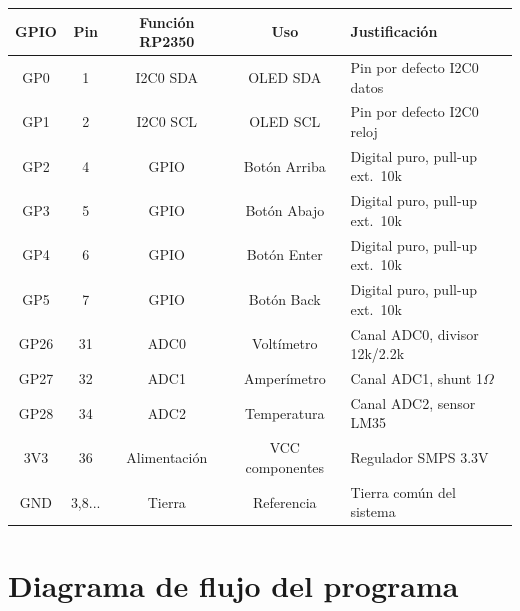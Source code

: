 \documentclass[letterpaper,12pt]{article}
\begin{document}
    \begin{center}
    \begin{tabular}{|c|c|c|c|l|}
        \hline
        \textbf{GPIO} & \textbf{Pin} & \textbf{Función RP2350} & \textbf{Uso} & \textbf{Justificación} \\
        \hline
        GP0 & 1 & I2C0 SDA & OLED SDA & Pin por defecto I2C0 datos \\
        GP1 & 2 & I2C0 SCL & OLED SCL & Pin por defecto I2C0 reloj \\
        GP2 & 4 & GPIO & Botón Arriba & Digital puro, pull-up ext.\ 10k \\
        GP3 & 5 & GPIO & Botón Abajo  & Digital puro, pull-up ext.\ 10k \\
        GP4 & 6 & GPIO & Botón Enter  & Digital puro, pull-up ext.\ 10k \\
        GP5 & 7 & GPIO & Botón Back   & Digital puro, pull-up ext.\ 10k \\
        GP26 & 31 & ADC0 & Voltímetro & Canal ADC0, divisor 12k/2.2k \\
        GP27 & 32 & ADC1 & Amperímetro & Canal ADC1, shunt 1$\Omega$ \\
        GP28 & 34 & ADC2 & Temperatura & Canal ADC2, sensor LM35 \\
        3V3 & 36 & Alimentación & VCC componentes & Regulador SMPS 3.3V \\
        GND & 3,8... & Tierra & Referencia & Tierra común del sistema \\
        \hline
    \end{tabular}
    \end{center}

    \section{Diagrama de flujo del programa}
\end{document}
